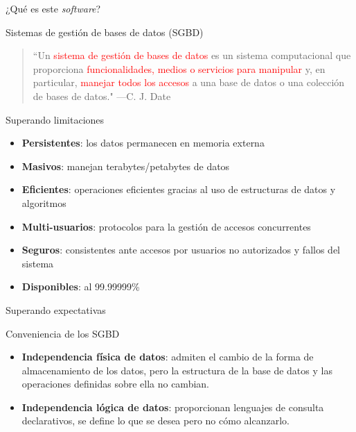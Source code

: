 \begin{frame}{¿Qu\'e es este \textit{software}?}



    \begin{block}{Sistemas de gesti\'on de bases de datos (SGBD)}
        \begin{quote}
            ``Un \textcolor{red}{sistema de gesti\'on de bases de datos}
            es un sistema computacional que proporciona
            \textcolor{red}{funcionalidades, medios o servicios para manipular} y, en particular,
            \textcolor{red}{manejar todos los accesos} a una base de datos o una colecci\'on
            de bases de datos." \hspace{1em plus 1fill}---C. J. Date
        \end{quote}
    \end{block}
\end{frame}


\begin{frame}{Superando limitaciones}
       
            \begin{block}{}
                \begin{itemize}
                    \item<1-> \textbf{Persistentes}: los datos permanecen en memoria externa
                    \item<2-> \textbf{Masivos}: manejan terabytes/petabytes de datos
                    \item<3-> \textbf{Eficientes}: operaciones eficientes gracias al uso de estructuras de datos y algoritmos
                    \item<4-> \textbf{Multi-usuarios}: protocolos para la gesti\'on de accesos concurrentes
                    \item<5-> \textbf{Seguros}: consistentes ante accesos por usuarios no autorizados y fallos del sistema
                    \item<6-> \textbf{Disponibles}: al 99.99999\%
                \end{itemize}
            \end{block}
               
\end{frame}


\begin{frame}{Superando expectativas}
    \begin{block}{Conveniencia de los SGBD}
        \begin{itemize}
            \item<2-> \textbf{Independencia f\'isica de datos}: admiten el cambio de la forma de
            almacenamiento de los datos, pero la estructura de la base de datos y las operaciones
            definidas sobre ella no cambian.
            \item<3-> \textbf{Independencia l\'ogica de datos}: proporcionan lenguajes de consulta declarativos, se define
            lo que se desea pero no c\'omo alcanzarlo.
        \end{itemize}
        
    \end{block}

\end{frame}


